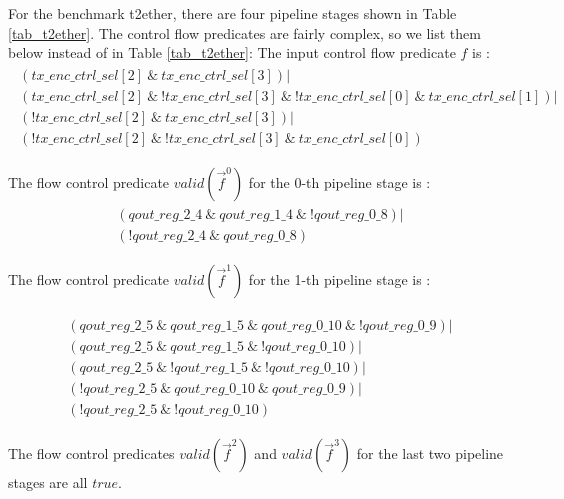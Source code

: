\documentclass[runningheads,a4paper,orivec]{llncs}
\begin{document}
For the benchmark t2ether,
there are four pipeline stages shown in Table \ref{tab_t2ether}.
The control flow predicates are fairly complex, 
so we list them below instead of in Table \ref{tab_t2ether}:
The input control flow predicate $f$ is :
\begin{multline}
\begin{array}{l}
( tx\_enc\_ctrl\_sel[2]~\&~tx\_enc\_ctrl\_sel[3] ) | \\
( tx\_enc\_ctrl\_sel[2]~\&~!tx\_enc\_ctrl\_sel[3]~\&~!tx\_enc\_ctrl\_sel[0]~\&~tx\_enc\_ctrl\_sel[1] ) | \\
( !tx\_enc\_ctrl\_sel[2]~\&~tx\_enc\_ctrl\_sel[3] ) | \\
( !tx\_enc\_ctrl\_sel[2]~\&~!tx\_enc\_ctrl\_sel[3]~\&~tx\_enc\_ctrl\_sel[0] )
\end{array}
\end{multline}

The flow control predicate $valid(\vec{f}^0)$ for the 0-th pipeline stage is :
\begin{multline}
\begin{array}{l}
( qout\_reg\_2\_4~\&~qout\_reg\_1\_4~\&~!qout\_reg\_0\_8) | \\
( !qout\_reg\_2\_4~\&~qout\_reg\_0\_8)
\end{array}
\end{multline}

The flow control predicate $valid(\vec{f}^1)$ for the 1-th pipeline stage is :

\begin{multline}
\begin{array}{l}
( qout\_reg\_2\_5~\&~qout\_reg\_1\_5~\&~qout\_reg\_0\_10~\&~!qout\_reg\_0\_9) | \\
( qout\_reg\_2\_5~\&~qout\_reg\_1\_5~\&~!qout\_reg\_0\_10) | \\
( qout\_reg\_2\_5~\&~!qout\_reg\_1\_5~\&~!qout\_reg\_0\_10) | \\
( !qout\_reg\_2\_5~\&~qout\_reg\_0\_10~\&~qout\_reg\_0\_9) | \\
( !qout\_reg\_2\_5~\&~!qout\_reg\_0\_10)
\end{array}
\end{multline}


The flow control predicates $valid(\vec{f}^2)$ and $valid(\vec{f}^3)$ for the last two pipeline stages are all $true$.
\end{document}
